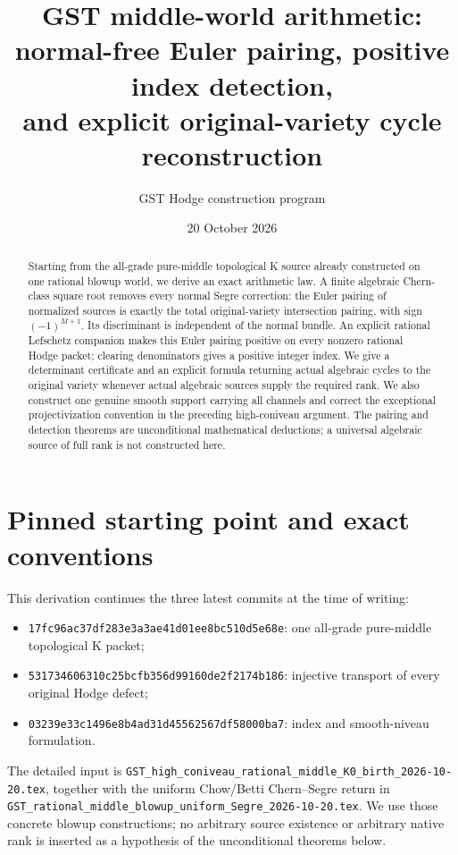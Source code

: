 \documentclass[11pt]{article}
\title{GST middle-world arithmetic:\\
normal-free Euler pairing, positive index detection,\\
and explicit original-variety cycle reconstruction}
\author{GST Hodge construction program}
\date{20 October 2026}
\begin{document}
\maketitle
\begin{abstract}
Starting from the all-grade pure-middle topological K source already
constructed on one rational blowup world, we derive an exact arithmetic
law. A finite algebraic Chern-class square root removes every normal
Segre correction: the Euler pairing of normalized sources is exactly
the total original-variety intersection pairing, with sign
$(-1)^{M+1}$. Its discriminant is independent of the normal bundle.
An explicit rational Lefschetz companion makes this Euler pairing
positive on every nonzero rational Hodge packet; clearing denominators
gives a positive integer index. We give a determinant certificate
and an explicit formula returning actual algebraic cycles to the
original variety whenever actual algebraic sources supply the required
rank. We also construct one genuine smooth support carrying all
channels and correct the exceptional projectivization convention in
the preceding high-coniveau argument. The pairing and detection
theorems are unconditional mathematical deductions; a universal
algebraic source of full rank is not constructed here.
\end{abstract}

\section{Pinned starting point and exact conventions}
This derivation continues the three latest commits at the time of
writing:
\begin{itemize}
\item \texttt{17fc96ac37df283e3a3ae41d01ee8bc510d5e68e}:
one all-grade pure-middle topological K packet;
\item \texttt{531734606310c25bcfb356d99160de2f2174b186}:
injective transport of every original Hodge defect;
\item \texttt{03239e33c1496e8b4ad31d45562567df58000ba7}:
index and smooth-niveau formulation.
\end{itemize}
The detailed input is
\texttt{GST\_high\_coniveau\_rational\_middle\_K0\_birth\_2026-10-20.tex},
together with the uniform Chow/Betti Chern--Segre return in
\texttt{GST\_rational\_middle\_blowup\_uniform\_Segre\_2026-10-20.tex}.
We use those concrete blowup constructions; no arbitrary source
existence or arbitrary native rank is inserted as a hypothesis of the
unconditional theorems below.
\end{document}
